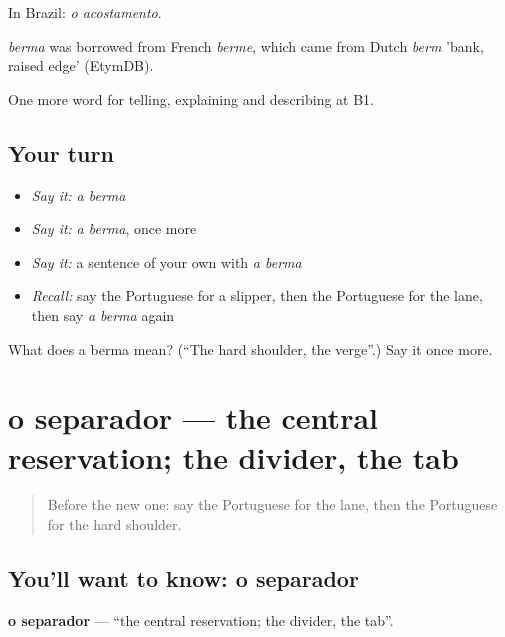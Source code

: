 In Brazil: \emph{o acostamento}.

\begin{cousinweb}
\emph{berma} was borrowed from French \emph{berme}, which came from Dutch \emph{berm} 'bank, raised edge' (EtymDB).
\end{cousinweb}

\begin{grammarlens}[title={What you've built}]
One more word for telling, explaining and describing at B1.
\end{grammarlens}

\subsection*{Your turn}
\begin{itemize}
\raggedright
  \item \emph{Say it:} \emph{a berma}
  \item \emph{Say it:} \emph{a berma}, once more
  \item \emph{Say it:} a sentence of your own with \emph{a berma}
  \item \emph{Recall:} say the Portuguese for a slipper, then the Portuguese for the lane, then say \emph{a berma} again
\end{itemize}

\begin{tcolorbox}[breakable,colback=teal!4,colframe=teal!35!black,title={Before you move on}]
What does a berma mean? (\textquotedblleft{}The hard shoulder, the verge\textquotedblright{}.) Say it once more.
\end{tcolorbox}
\section[o separador]{o separador — the central reservation; the divider, the tab}

\label{lesson:PT-C401-separador}



\begin{quote}
Before the new one: say the Portuguese for the lane, then the Portuguese for the hard shoulder.
\end{quote}

\subsection*{You'll want to know: o separador}
\textbf{o separador} — \textquotedblleft{}the central reservation; the divider, the tab\textquotedblright{}.

